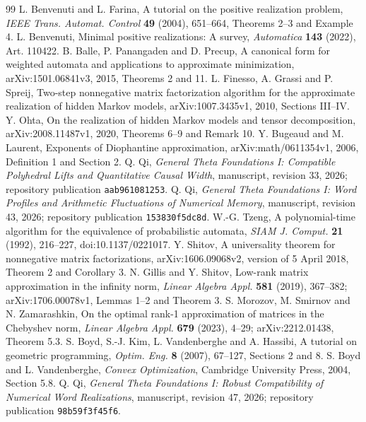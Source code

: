 \begin{thebibliography}{99}
 L. Benvenuti and L. Farina,
A tutorial on the positive realization problem,
\emph{IEEE Trans. Automat. Control} \textbf{49} (2004), 651--664,
Theorems 2--3 and Example 4.
 L. Benvenuti,
Minimal positive realizations: A survey,
\emph{Automatica} \textbf{143} (2022), Art. 110422.
 B. Balle, P. Panangaden and D. Precup,
A canonical form for weighted automata and applications to approximate minimization,
arXiv:1501.06841v3, 2015, Theorems 2 and 11.
 L. Finesso, A. Grassi and P. Spreij,
Two-step nonnegative matrix factorization algorithm for the approximate realization of hidden Markov models,
arXiv:1007.3435v1, 2010, Sections III--IV.
 Y. Ohta,
On the realization of hidden Markov models and tensor decomposition,
arXiv:2008.11487v1, 2020, Theorems 6--9 and Remark 10.
 Y. Bugeaud and M. Laurent,
Exponents of Diophantine approximation,
arXiv:math/0611354v1, 2006, Definition 1 and Section 2.
 Q. Qi,
\emph{General Theta Foundations I: Compatible Polyhedral Lifts and Quantitative Causal Width},
manuscript, revision 33, 2026; repository publication \texttt{aab961081253}.
 Q. Qi,
\emph{General Theta Foundations I: Word Profiles and Arithmetic Fluctuations of Numerical Memory},
manuscript, revision 43, 2026; repository publication \texttt{153830f5dc8d}.
 W.-G. Tzeng,
A polynomial-time algorithm for the equivalence of probabilistic automata,
\emph{SIAM J. Comput.} \textbf{21} (1992), 216--227,
doi:10.1137/0221017.
 Y. Shitov,
A universality theorem for nonnegative matrix factorizations,
arXiv:1606.09068v2, version of 5 April 2018, Theorem 2 and Corollary 3.
 N. Gillis and Y. Shitov,
Low-rank matrix approximation in the infinity norm,
\emph{Linear Algebra Appl.} \textbf{581} (2019), 367--382;
arXiv:1706.00078v1, Lemmas 1--2 and Theorem 3.
 S. Morozov, M. Smirnov and N. Zamarashkin,
On the optimal rank-1 approximation of matrices in the Chebyshev norm,
\emph{Linear Algebra Appl.} \textbf{679} (2023), 4--29;
arXiv:2212.01438, Theorem 5.3.
 S. Boyd, S.-J. Kim, L. Vandenberghe and A. Hassibi,
A tutorial on geometric programming,
\emph{Optim. Eng.} \textbf{8} (2007), 67--127, Sections 2 and 8.
 S. Boyd and L. Vandenberghe,
\emph{Convex Optimization}, Cambridge University Press, 2004, Section 5.8.
 Q. Qi,
\emph{General Theta Foundations I: Robust Compatibility of Numerical Word Realizations},
manuscript, revision 47, 2026; repository publication \texttt{98b59f3f45f6}.
\end{thebibliography}
